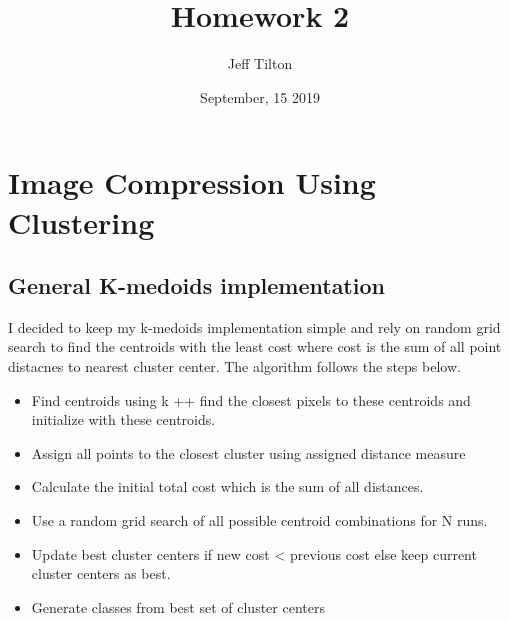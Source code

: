 \documentclass[a4paper]{article}
\title{Homework 2}
\author{Jeff Tilton}
\date{September, 15 2019}
\begin{document}
\maketitle

\section{Image Compression Using Clustering}
\subsection{General K-medoids implementation}
I decided to keep my k-medoids implementation simple and rely on random grid search to find the centroids with the least cost where cost is the sum of all point distacnes to nearest cluster center.  The algorithm follows the steps below.

	\begin{itemize}
		\item Find centroids using k ++ find the closest pixels to these centroids and initialize with these centroids.
		\item Assign all points to the closest cluster using assigned distance measure
		\item Calculate the initial total cost which is the sum of all distances.
		\item Use a random grid search of all possible centroid combinations for N runs.
		\item Update best cluster centers if new cost < previous cost else keep current cluster centers as best.
		\item Generate classes from best set of cluster centers
	\end{itemize} 
	
\end{document}
